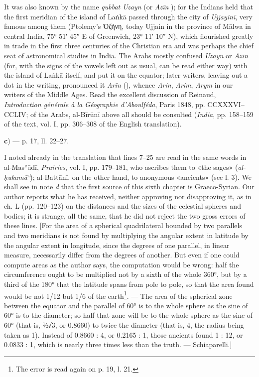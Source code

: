 \documentclass[11pt]{article}
\newcommand{\Pg}[1]{\marginpar{\footnotesize\color{gray}#1}}
\begin{document}
\par It was also known by the name \emph{qubbat Uzayn} (or \emph{Azīn} ); for the Indians held that the first meridian of the island of Laṅkā passed through the city of \emph{Ujjayinī}, very famous among them (Ptolemy's {\greekfont Ὀζήνη}, today Ujjain  in the province of Mālwa in central India, 75° 51′ 45″ E of Greenwich, 23° 11′ 10″ N), which flourished greatly in trade in the first three centuries of the Christian era and was perhaps the chief seat of astronomical studies in India. The Arabs mostly confused \emph{Uzayn} or \emph{Azīn} (for, with the signs of the vowels left out as usual,  can be read either way) with the island of Laṅkā itself, and put it on the equator; later writers, leaving out a dot in the writing, pronounced it \emph{Arīn} (), whence \emph{Arin}, \emph{Arim}, \emph{Arym} in our writers of the Middle Ages. Read the excellent discussion of Reinaud, \emph{Introduction générale à la Géographie d’Aboulféda}, Paris 1848, pp. CCXXXVI–CCLIV; of the Arabs, al-Bīrūnī above all should be consulted (\emph{India}, pp. 158–159 of the text, vol. I, pp. 306–308 of the English translation).\par
\par\begin{center}\textbf{c}) — p. 17, ll. 22–27.\end{center}
\par \Pg{I 166}I noted already in the translation that lines 7–25 are read in the same words in al-Masʿūdī, \emph{Prairies}, vol. I, pp. 179–181, who ascribes them to «the sages» (\emph{al-ḥukamāʾ}); al-Battānī, on the other hand, to anonymous «ancients» (see l. 3). We shall see in note \emph{d} that the first source of this sixth chapter is Graeco-Syrian. Our author reports what he has received, neither approving nor disapproving it, as in ch. L (pp. 120–123) on the distances and the sizes of the celestial spheres and bodies; it is strange, all the same, that he did not reject the two gross errors of these lines. [For the area of a spherical quadrilateral bounded by two parallels and two meridians is not found by multiplying the angular extent in latitude by the angular extent in longitude, since the degrees of one parallel, in linear measure, necessarily differ from the degrees of another. But even if one could compute areas as the author says, the computation would be wrong: half the circumference ought to be multiplied not by a sixth of the whole 360°, but by a third of the 180° that the latitude spans from pole to pole, so that the area found would be not 1/12 but 1/6 of the earth\footnote{The error is read again on p. 19, l. 21.}. — The area of the spherical zone between the equator and the parallel of 60° is to the whole sphere as the sine of 60° is to the diameter; so half that zone will be to the whole sphere as the sine of 60° (that is, ½√3, or 0.8660) to twice the diameter (that is, 4, the radius being taken as 1). Instead of 0.8660 : 4, or 0.2165 : 1, those ancients found 1 : 12, or 0.0833 : 1, which is nearly three times less than the truth. — Schiaparelli.]\par
\end{document}
